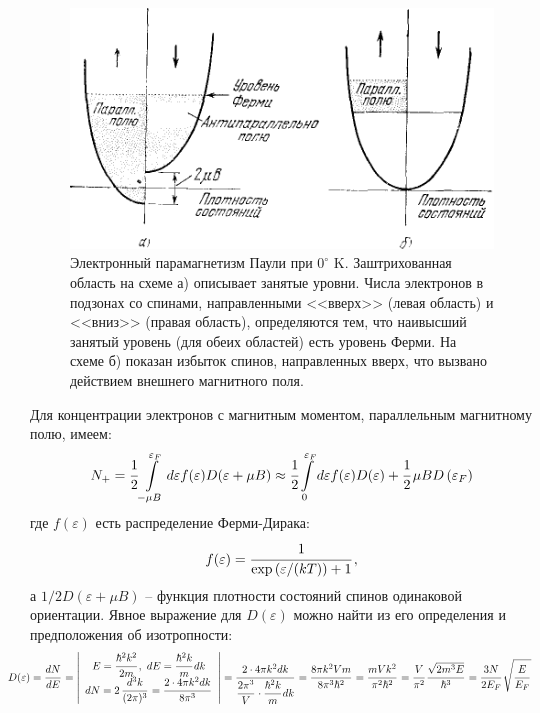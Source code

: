 \documentclass[a4paper, 12pt, openany]{book}
\begin{document}
    \begin{figure}[!h]
        \includegraphics[width=\textwidth]{parabola}
        \caption{
        Электронный парамагнетизм Паули при $0^{\circ}$ K.
        Заштрихованная область на схеме а) описывает занятые уровни.
        Числа электронов в подзонах со спинами, направленными <<вверх>> (левая область) и <<вниз>> (правая область), определяются тем, что наивысший занятый уровень (для обеих областей) есть уровень Ферми.
        На схеме б) показан избыток спинов, направленных вверх, что вызвано действием внешнего магнитного поля.
    }
        \label{fig:parabola}
    \end{figure}
    Для концентрации электронов с магнитным моментом, параллельным магнитному полю, имеем:
    \begin{equation}
        N_{+}=\cfrac{1}{2} \int\limits_{-\mu B}^{\varepsilon_{F}} d \varepsilon f(\varepsilon) D(\varepsilon+\mu B) \approx \cfrac{1}{2} \int\limits_{0}^{\varepsilon_{F}} d \varepsilon f(\varepsilon) D(\varepsilon)+\cfrac{1}{2}\, \mu B D\left(\varepsilon_{F}\right)
        \label{eq:N+}
    \end{equation}
    где $f (\varepsilon)$ есть распределение Ферми-Дирака: 
    \begin{equation}
        f (\varepsilon) = \cfrac{1}{\exp\left(\varepsilon / (kT) \right) + 1}\, ,
        \label{eq:fermi_dirak_statistics}
    \end{equation}
    а $1 / 2 D(\varepsilon + \mu B)$ -- функция плотности состояний спинов одинаковой ориентации. Явное выражение для $D(\varepsilon)$ можно найти из его определения и предположения об изотропности:
    \begin{equation*}
    \hspace*{-8mm}
        D(\varepsilon) = \cfrac{dN}{dE}\, = \left|
        \begin{array}{c}
            E = \cfrac{\hbar^2 k^2}{2m}\, ,
            ~ dE = \cfrac{\hbar^2k}{m}\, dk \\
            dN = 2\, \cfrac{d^3k}{(2\pi)^3}\, =
            \cfrac{2 \cdot 4 \pi k^2 dk}{8 \pi^3}\, 
        \end{array}
        \right| = \cfrac{2 \cdot 4\pi k^2 dk}{\cfrac{2\pi^3}{V}\, \cdot \cfrac{\hbar^2 k}{m}\, dk}\, =
        \cfrac{8 \pi k^2 Vm}{8 \pi^3 \hbar^2}\, =
        \cfrac{mVk^2}{\pi^2 \hbar^2}\, = \cfrac{V}{\pi^2}\, \cfrac{\sqrt{2m^3E}}{\hbar^3}\, =
        \cfrac{3N}{2 E_{F}}\,  \sqrt{\cfrac{E}{E_{F}}\, }
    \end{equation*}
\end{document}
